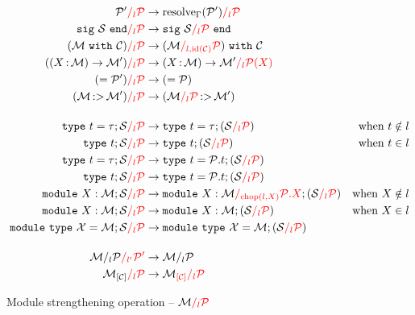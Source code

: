 \begin{align*}
  \Ostrengthen{l}{\iP}{\iP'}
  &\to \Ostrengthen{l}{\iP}{\resolve{\E}{\iP'}}\\
  \Ostrengthen{l}{\iP}{\Ssig{\iS}}
  &\to \Ssig{\Ostrengthen{l}{\iP}{\iS}}\\
  \Ostrengthen{l}{\iP}{(\Swith{\iM}{\iC})}
  &\to \Swith{(\Ostrengthen{l,\operatorname{id}(\iC)}{\iP}{\iM})}{\iC}\\
  \Ostrengthen{l}{\iP}{(\Sfunctor{\ix}{\iM}{\iM'})}
  &\to \Sfunctor{\ix}{\iM}{\Ostrengthen{l}{\iP(X)}{\iM'}}\\
  \Ostrengthen{l}{\iP}{\Salias{\iP'}}
  &\to \Salias{\iP}\\
  \Ostrengthen{l}{\iP}{\Stransp{\iM}{\iM'}}
  &\to \Stransp{\Ostrengthen{l}{\iP}{\iM}}{\iM'}\\[4mm]
  \Ostrengthen{l}{\iP}{\Stype{t}{\tau};\iS}
  &\to \Stype{t}{\tau};(\Ostrengthen{l}{\iP}{\iS}) &\text{when } t\notin l\\
  \Ostrengthen{l}{\iP}{\Stypeabs{t};\iS}
  &\to \Stypeabs{t};(\Ostrengthen{l}{\iP}{\iS}) &\text{when } t\in l\\
  \Ostrengthen{l}{\iP}{\Stype{t}{\tau};\iS}
  &\to \Stype{t}{\iP.t};(\Ostrengthen{l}{\iP}{\iS}) \\
  \Ostrengthen{l}{\iP}{\Stypeabs{t};\iS}
  &\to \Stype{t}{\iP.t};(\Ostrengthen{l}{\iP}{\iS}) \\
  \Ostrengthen{l}{\iP}{\Smodulety{\ix}{\iM};\iS}
  &\to \Smodulety{\ix}{\Ostrengthen{\operatorname{chop}(l,\ix)}{\iP.\ix}{\iM}};
    (\Ostrengthen{l}{\iP}{\iS}) &\text{when } \ix\notin l\\
  \Ostrengthen{l}{\iP}{\Smodulety{\ix}{\iM};\iS}
  &\to \Smodulety{\ix}{\iM};
    (\Ostrengthen{l}{\iP}{\iS})  &\text{when } \ix\in l\\
  \Ostrengthen{l}{\iP}{\Smoduletype{\iX}{\iM};\iS}
  &\to \Smoduletype{\iX}{\iM};
    (\Ostrengthen{l}{\iP}{\iS}) \\[4mm]
  \Ostrengthen{l'}{\iP'}{\Sstrengthen{l}{\iP}{\iM}}
  &\to \Sstrengthen{l}{\iP}{\iM}\\
  \Ostrengthen{l}{\iP}{\Ssubst{\iC}{\iM}}
  &\to \Ostrengthen{l}{\iP}{\Osubst{\iC}{\iM}}\\
\end{align*}\vspace{-3mm}
\caption{Module strengthening operation -- $\Ostrengthen{l}{\iP}{\iM}$}
\label{module:strengthen}

